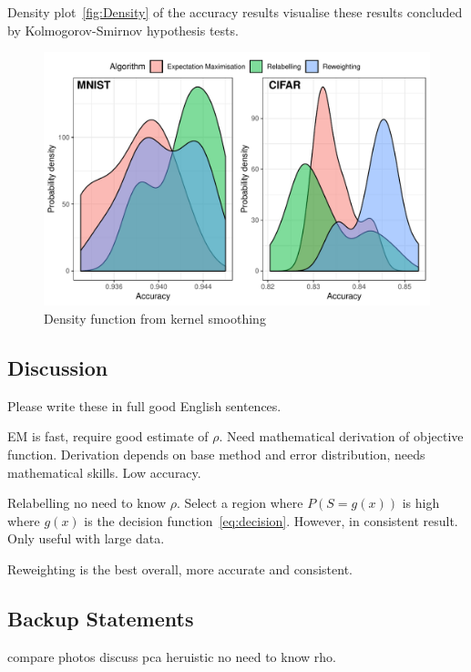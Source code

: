 \documentclass[12pt]{article} %
\begin{document}
Density plot~\eqref{fig:Density} of the accuracy results visualise these results concluded by Kolmogorov-Smirnov hypothesis tests.
\begin{figure}
    \centering
	\includegraphics[scale=0.9]{histo}
	\caption{Density function from kernel smoothing}
	\label{fig:Density}
\end{figure}




\subsection{Discussion}
Please write these in full good English sentences.

EM is fast, require good estimate of $\rho$. Need mathematical derivation of objective function. Derivation depends on base method and error distribution, needs mathematical skills. Low accuracy.

Relabelling no need to know $\rho$. Select a region where $P(S=g(x))$ is high where $g(x)$ is the decision function~\eqref{eq:decision}. However, in consistent result. Only useful with large data.

Reweighting is the best overall, more accurate and consistent.

\subsection{Backup Statements}
compare photos
discuss pca
heruistic no need to know rho.
\end{document}
